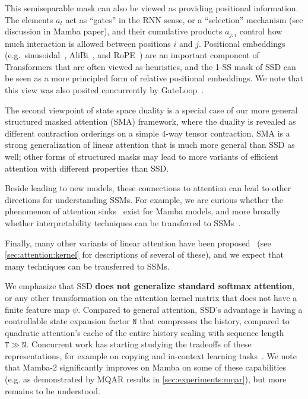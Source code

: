 \documentclass{article}
\newcommand{\citep}{\parencite}
\begin{document}
This semiseparable mask can also be viewed as providing positional information.
The elements $a_t$ act as ``gates'' in the RNN sense, or a ``selection'' mechanism (see discussion in Mamba paper),
and their cumulative products $a_{j:i}$ control how much interaction is allowed between positions $i$ and $j$.
Positional embeddings (e.g.\ sinusoidal~\citep{vaswani2017attention}, AliBi~\citep{press2022train}, and RoPE~\citep{su2021roformer}) are an important component of Transformers that are often viewed as heuristics,
and the 1-SS mask of SSD can be seen as a more principled form of relative positional embeddings.
We note that this view was also posited concurrently by GateLoop~\citep{katsch2023gateloop}.

The second viewpoint of state space duality is a special case of our more general structured masked attention (SMA) framework,
where the duality is revealed as different contraction orderings on a simple 4-way tensor contraction.
SMA is a strong generalization of linear attention that is much more general than SSD as well;
other forms of structured masks may lead to more variants of efficient attention with different properties than SSD.

Beside leading to new models, these connections to attention can lead to other directions for understanding SSMs.
For example, we are curious whether the phenomenon of attention sinks~\citep{darcet2024vision,xiao2024efficient} exist for Mamba models,
and more broadly whether interpretability techniques can be transferred to SSMs~\citep{ali2024hidden}.

Finally, many other variants of linear attention have been proposed~\citep{schlag2021linear,peng2021random,choromanski2021rethinking,qin2022devil,qin2022cosformer,zheng2022linear,zhang2024hedgehog,arora2024zoology,arora2024simple} (see \cref{sec:attention:kernel} for descriptions of several of these),
and we expect that many techniques can be transferred to SSMs\iftoggle{arxiv}{ (e.g. \cref{sec:architecture:kernels})}{}.

We emphasize that SSD \textbf{does not generalize standard softmax attention}, or any other transformation on the attention kernel matrix that does not have a finite feature map $\psi$.
Compared to general attention, SSD's advantage is having a controllable state expansion factor $\mathtt{N}$ that compresses the history, compared to quadratic attention's cache of the entire history scaling with sequence length $\mathtt{T} \gg \mathtt{N}$.
Concurrent work has starting studying the tradeoffs of these representations, for example on copying and in-context learning tasks~\citep{akyurek2024context,jelassi2024repeat,grazzi2024mamba,park2024can}.
We note that Mamba-2 significantly improves on Mamba on some of these capabilities (e.g. as demonstrated by MQAR results in \cref{sec:experiments:mqar}), but more remains to be understood.
\end{document}
